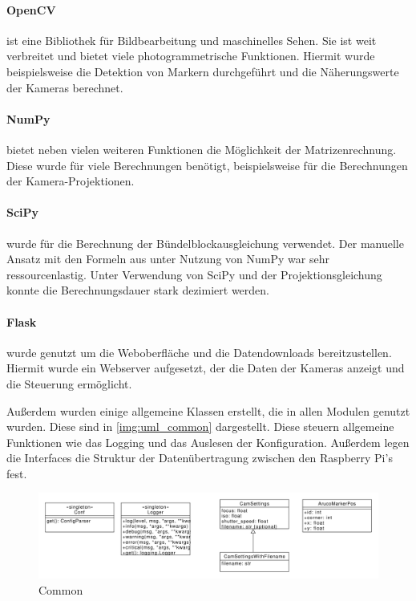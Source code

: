\documentclass[./00PhotoBox.tex]{subfiles}
\begin{document}
\paragraph{OpenCV}
ist eine Bibliothek für Bildbearbeitung und maschinelles Sehen. Sie ist weit verbreitet und bietet viele photogrammetrische Funktionen. Hiermit wurde beispielsweise die Detektion von Markern durchgeführt und die Näherungswerte der Kameras berechnet.

\paragraph{NumPy}
bietet neben vielen weiteren Funktionen die Möglichkeit der Matrizenrechnung. Diese wurde für viele Berechnungen benötigt, beispielsweise für die Berechnungen der Kamera-Projektionen.

\paragraph{SciPy}
wurde für die Berechnung der Bündelblockausgleichung verwendet. Der manuelle Ansatz mit den Formeln aus \cite{luhmann} unter Nutzung von NumPy war sehr ressourcenlastig. Unter Verwendung von SciPy und der Projektionsgleichung konnte die Berechnungsdauer stark dezimiert werden.

\paragraph{Flask}
wurde genutzt um die Weboberfläche und die Datendownloads bereitzustellen. Hiermit wurde ein Webserver aufgesetzt, der die Daten der Kameras anzeigt und die Steuerung ermöglicht.

Außerdem wurden einige allgemeine Klassen erstellt, die in allen Modulen genutzt wurden. Diese sind in \autoref{img:uml_common} dargestellt. Diese steuern allgemeine Funktionen wie das Logging und das Auslesen der Konfiguration. Außerdem legen die Interfaces die Struktur der Datenübertragung zwischen den Raspberry Pi's fest.

\begin{figure}
    \centering
    \includegraphics[width=1\textwidth]{./img/uml/uml_common_classdiagramm.pdf}
    \centering
    \caption{Common} %
    \label{img:uml_common} %
\end{figure}
\end{document}
